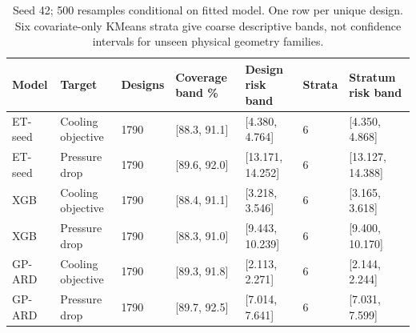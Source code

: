 \begin{table}[htbp]\centering\small\setlength{\tabcolsep}{3pt}\begin{tabular}{lllllll}
\toprule
Model & Target & Designs & Coverage band \% & Design risk band & Strata & Stratum risk band\\\midrule
ET-seed & Cooling objective & 1790 & [88.3, 91.1] & [4.380, 4.764] & 6 & [4.350, 4.868]\\
ET-seed & Pressure drop & 1790 & [89.6, 92.0] & [13.171, 14.252] & 6 & [13.127, 14.388]\\
XGB & Cooling objective & 1790 & [88.4, 91.1] & [3.218, 3.546] & 6 & [3.165, 3.618]\\
XGB & Pressure drop & 1790 & [88.3, 91.0] & [9.443, 10.239] & 6 & [9.400, 10.170]\\
GP-ARD & Cooling objective & 1790 & [89.3, 91.8] & [2.113, 2.271] & 6 & [2.144, 2.244]\\
GP-ARD & Pressure drop & 1790 & [89.7, 92.5] & [7.014, 7.641] & 6 & [7.031, 7.599]\\
\bottomrule\end{tabular}\caption{Seed 42; 500 resamples conditional on fitted model. One row per unique design. Six covariate-only KMeans strata give coarse descriptive bands, not confidence intervals for unseen physical geometry families.}\label{tab:ubend-intervals}\end{table}
